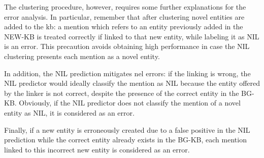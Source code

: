 The clustering procedure, however, requires some further explanations for the error analysis.
In particular, remember that after clustering novel entities are added to the \ac{kb}:
a mention which refers to an entity previously added in the NEW-KB is treated correctly if linked to that new entity, while labeling it as NIL is an error.
This precaution avoids obtaining high performance in case the NIL clustering presents each mention as a novel entity.


In addition, the NIL prediction mitigates \ac{nel} errors: if the linking is wrong, the NIL predictor would ideally classify the mention as NIL because the entity offered by the linker is not correct, despite the presence of the correct entity in the BG-KB.
Obviously, if the NIL predictor does not classify the mention of a novel entity as NIL, it is considered as an error.


Finally, if a new entity is erroneously created due to a false positive in the NIL prediction while the correct entity already exists in the BG-KB, each mention linked to this incorrect new entity is considered as an error.


